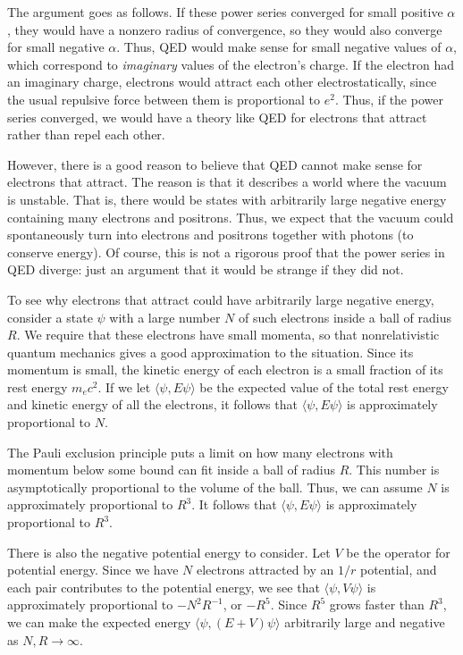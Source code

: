 \documentclass[12pt]{article}
\begin{document}
The argument goes as follows. If these power series converged for small positive $\alpha$, they would have a nonzero radius of convergence, so they would also converge for small negative $\alpha$.  Thus, QED would make sense for small negative values of $\alpha$, which correspond to \emph{imaginary} values of the electron's charge.  If the electron had an imaginary charge, electrons would attract each other electrostatically, since the usual repulsive force between them is proportional to $e^2$.  Thus, if the power series converged, we would have a theory like QED for electrons that attract rather than repel each other.

However, there is a good reason to believe that QED cannot make sense for electrons that attract.  The reason is that it describes a world where the vacuum is unstable. That is, there would be states with arbitrarily large negative energy containing many electrons and positrons.  Thus, we expect that the vacuum could spontaneously turn into electrons and positrons together with photons (to conserve energy).   Of course, this is not a rigorous proof that the power series in QED diverge: just an argument that it would be strange if they did not.

To see why electrons that attract could have arbitrarily large negative energy, consider a state $\psi$ with a large number $N$ of such electrons inside a ball of radius $R$.   We require that these electrons have small momenta, so that nonrelativistic quantum mechanics gives a good approximation to the situation.   Since its momentum is small, the kinetic energy of each electron is a small fraction of its rest energy $m_e c^2$.   If we let $\langle \psi, E \psi\rangle$ be the expected value of the total rest energy and kinetic energy of all the electrons, it follows that $\langle \psi, E\psi \rangle$ is approximately proportional to $N$.

The Pauli exclusion principle puts a limit on how many electrons with momentum below some bound can fit inside a ball of radius $R$.    This number is asymptotically proportional to the volume of the ball.  Thus, we can assume $N$ is approximately proportional to $R^3$.    It follows that $\langle \psi, E \psi \rangle$ is approximately proportional to $R^3$.   

There is also the negative potential energy to consider.   Let $V$ be the operator for potential energy.  Since we have $N$ electrons attracted by an $1/r$ potential, and each pair contributes to the potential energy, we see that $\langle \psi , V \psi \rangle$ is approximately proportional to $-N^2 R^{-1}$, or $-R^5$.  Since $R^5$ grows faster than $R^3$, we can make the expected energy $\langle \psi, (E + V) \psi \rangle$ arbitrarily large and negative as $N,R \to \infty$.
\end{document}
